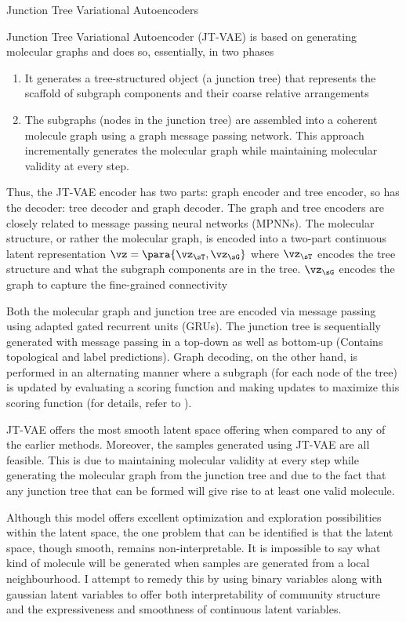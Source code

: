 \documentclass{article}
\begin{document}
\begin{psection}{Junction Tree Variational Autoencoders}

	Junction Tree Variational Autoencoder (JT-VAE) \citep{jtvae} is based on generating molecular graphs and does so, essentially, in two phases
	\begin{enumerate}
		\item It generates a tree-structured object (a junction tree) that  represents  the  scaffold  of subgraph  components and  their  coarse  relative  arrangements
		\item The subgraphs (nodes in the junction tree) are assembled into a coherent molecule graph using a graph message passing network. This approach incrementally generates the molecular graph while maintaining molecular validity at every step.
	\end{enumerate}

	Thus, the JT-VAE encoder has two parts: graph encoder and tree encoder, so has the decoder: tree decoder and graph decoder. The graph and tree encoders are closely related to message passing neural networks (MPNNs). The molecular structure, or rather the molecular graph, is encoded into a two-part continuous latent representation $\vz = \para{\vz_\sT, \vz_\sG}$ where $\vz_\sT$ encodes the tree structure and what the subgraph components are in the tree. $\vz_\sG$ encodes the graph to capture the fine-grained connectivity

	Both the molecular graph and junction tree are encoded via message passing using adapted gated recurrent units (GRUs). The junction tree is sequentially generated with message passing in a top-down as well as bottom-up (Contains topological and label predictions). Graph decoding, on the other hand, is performed in an alternating manner where a subgraph (for each node of the tree) is updated by evaluating a scoring function and making updates to maximize this scoring function (for details, refer to \citep{jtvae}).

	JT-VAE offers the most smooth latent space offering when compared to any of the earlier methods. Moreover, the samples generated using JT-VAE are all feasible. This is due to maintaining molecular validity at every step while generating the molecular graph from the junction tree and due to the fact that any junction tree that can be formed will give rise to at least one valid molecule.

	Although this model offers excellent optimization and exploration possibilities within the latent space, the one problem that can be identified is that the latent space, though smooth, remains non-interpretable. It is impossible to say what kind of molecule will be generated when samples are generated from a local neighbourhood. I attempt to remedy this by using binary variables along with gaussian latent variables to offer both interpretability of community structure and the expressiveness and smoothness of continuous latent variables.

\end{psection}
\end{document}
